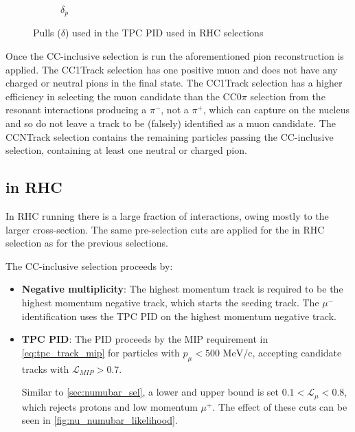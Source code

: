 \begin{figure}[h]
\begin{subfigure}[t]{0.32\textwidth}
		\caption{$\delta_p$}
	\end{subfigure}
	\caption{Pulls ($\delta$) used in the TPC PID used in \numubar RHC selections}
	\label{fig:numubar_pulls}
\end{figure}

Once the \numubar CC-inclusive selection is run the aforementioned pion reconstruction is applied. The \numubar CC1Track selection has one positive muon and does not have any charged or neutral pions in the final state. The \numubar CC1Track selection has a higher efficiency in selecting the muon candidate than the \numu CC0$\pi$ selection from the \numubar resonant interactions producing a $\pi^-$, not a $\pi^+$, which can capture on the nucleus and so do not leave a track to be (falsely) identified as a muon candidate. The \numubar CCNTrack selection contains the remaining particles passing the \numubar CC-inclusive selection, containing at least one neutral or charged pion.

\subsection{\numu in RHC}
\label{sec:numu_in_nubar_sel}
In RHC running there is a large fraction of \numu interactions, owing mostly to the larger \numu cross-section. The same pre-selection cuts are applied for the \numu in RHC selection as for the previous selections.

The CC-inclusive selection proceeds by:
\begin{itemize}
	\item \textbf{Negative multiplicity}: The highest momentum track is required to be the highest momentum negative track, which starts the seeding track. The $\mu^-$ identification uses the TPC PID on the highest momentum negative track. 
	
	\item \textbf{TPC PID}: The PID proceeds by the MIP requirement in \autoref{eq:tpc_track_mip} for particles with $p_\mu < 500 \text{ MeV/c}$, accepting candidate tracks with $\mathcal{L}_{MIP} > 0.7$.
	
	Similar to \autoref{sec:numubar_sel}, a lower and upper bound is set $0.1 < \mathcal{L}_\mu < 0.8$, which rejects protons and low momentum $\mu^+$. The effect of these cuts can be seen in \autoref{fig:nu_numubar_likelihood}.
\end{itemize}

